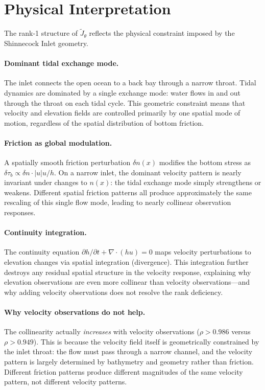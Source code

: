 \documentclass[11pt]{article}
\theoremstyle{definition}
\begin{document}
\section{Physical Interpretation}
\label{sec:physics}

The rank-1 structure of $\widetilde{J}_\theta$ reflects the physical
constraint imposed by the Shinnecock Inlet geometry.

\paragraph{Dominant tidal exchange mode.}
The inlet connects the open ocean to a back bay through a narrow
throat.  Tidal dynamics are dominated by a single exchange mode:
water flows in and out through the throat on each tidal cycle.  This
geometric constraint means that velocity and elevation fields are
controlled primarily by one spatial mode of motion, regardless of the
spatial distribution of bottom friction.

\paragraph{Friction as global modulation.}
A spatially smooth friction perturbation $\delta n(x)$ modifies the
bottom stress as $\delta\tau_b \propto \delta n \cdot |u|u/h$.  On a
narrow inlet, the dominant velocity pattern is nearly invariant under
changes to $n(x)$: the tidal exchange mode simply strengthens or
weakens.  Different spatial friction patterns all produce
approximately the same rescaling of this single flow mode, leading to
nearly collinear observation responses.

\paragraph{Continuity integration.}
The continuity equation $\partial h/\partial t + \nabla\cdot(hu) = 0$
maps velocity perturbations to elevation changes via spatial
integration (divergence).  This integration further destroys any
residual spatial structure in the velocity response, explaining why
elevation observations are even more collinear than velocity
observations---and why adding velocity observations does not resolve
the rank deficiency.

\paragraph{Why velocity observations do not help.}
The collinearity actually \emph{increases} with velocity observations
($\rho > 0.986$ versus $\rho > 0.949$).  This is because the
velocity field itself is geometrically constrained by the inlet
throat: the flow must pass through a narrow channel, and the velocity
pattern is largely determined by bathymetry and geometry rather than
friction.  Different friction patterns produce different magnitudes
of the same velocity pattern, not different velocity patterns.
\end{document}
